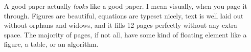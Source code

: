 A good paper actually \emph{looks} like a good paper.
I mean visually, when you page it through.
Figures are beautiful, equations are typeset nicely, text is well laid out without orphans and widows, and it fills 12 pages perfectly without any extra space.
The majority of pages, if not all, have some kind of floating element like a figure, a table, or an algorithm.
